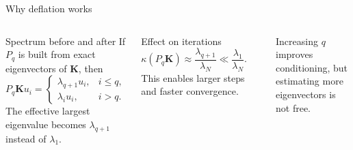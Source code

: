 \documentclass[aspectratio=169,11pt]{ctexbeamer}
\newcommand{\K}{\mathbf{K}}
\begin{document}
\begin{frame}{Why deflation works}
\begin{columns}[T,onlytextwidth]
\begin{block}{Spectrum before and after}
If $P_q$ is built from exact eigenvectors of $\K$, then
\[
P_q\K u_i =
\begin{cases}
\lambda_{q+1} u_i, & i\le q,\\
\lambda_i u_i, & i>q.
\end{cases}
\]
The effective largest eigenvalue becomes $\lambda_{q+1}$ instead of $\lambda_1$.
\end{block}
\begin{block}{Effect on iterations}
\[
\kappa(P_q\K)\approx \frac{\lambda_{q+1}}{\lambda_N} \ll \frac{\lambda_1}{\lambda_N}.
\]
This enables larger steps and faster convergence.
\end{block}
\begin{center}
\end{center}
\small Increasing $q$ improves conditioning, but estimating more eigenvectors is not free.
\end{columns}
\end{frame}
\end{document}
